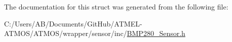 The documentation for this struct was generated from the following file\-:\begin{DoxyCompactItemize}
\item 
C\-:/\-Users/\-A\-B/\-Documents/\-Git\-Hub/\-A\-T\-M\-E\-L-\/\-A\-T\-M\-O\-S/\-A\-T\-M\-O\-S/wrapper/sensor/inc/\hyperlink{_b_m_p280___sensor_8h}{B\-M\-P280\-\_\-\-Sensor.\-h}\end{DoxyCompactItemize}
